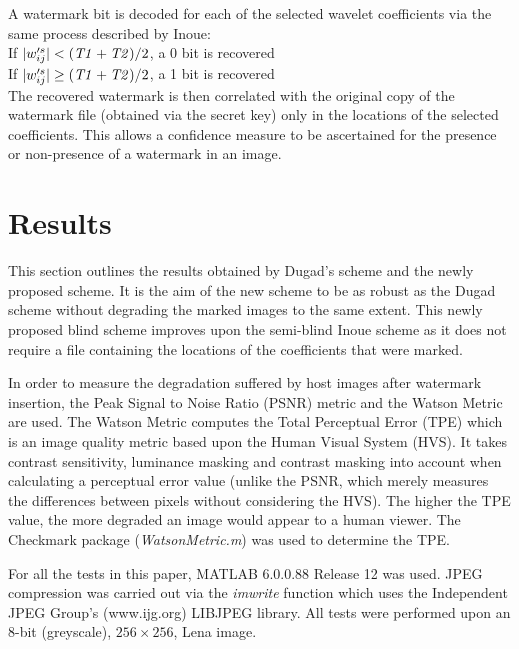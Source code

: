 \documentclass[10pt,twocolumn]{article}
\begin{document}
A watermark
bit is decoded for each of the selected wavelet coefficients via the same process
described by Inoue: \\
If $|w'^{s}_{ij}| < (\mbox{\emph{T1}} + \mbox{\emph{T2}}) / 2$, a 0 bit is recovered \\
If $|w'^{s}_{ij}| \geq (\mbox{\emph{T1}} + \mbox{\emph{T2}}) / 2$, a 1 bit is recovered \\
The recovered watermark is then correlated with the original copy of the
watermark file (obtained via the secret key) only in the 
locations of the selected coefficients. This allows a confidence measure
to be ascertained for the presence or non-presence of a watermark in an 
image.

\section{Results}
This section outlines the results obtained by Dugad's scheme and the newly 
proposed scheme. It is the aim of the new scheme to be as robust as
the Dugad scheme without degrading the marked images to the same extent. 
This newly proposed blind scheme improves upon the semi-blind Inoue scheme
as it does not require a file containing the locations of the coefficients that were marked.

In order to measure the degradation suffered by host images after watermark insertion, the
Peak Signal to Noise Ratio (PSNR) metric and the Watson Metric \cite{watsonDCT, mayache} are used.
The Watson Metric computes the Total Perceptual Error (TPE)
which is an image quality metric based upon the Human Visual System (HVS).
It takes contrast sensitivity,
luminance masking and contrast masking into account when calculating 
a perceptual error value (unlike the PSNR, which merely measures the differences
between pixels without considering the HVS). The higher the TPE value, the more degraded an
image would appear to a human viewer.
The Checkmark package \cite{ChkMrk:pereira} (\emph{WatsonMetric.m}) was used to determine the TPE.

For all the tests in this paper, MATLAB
6.0.0.88 Release 12 was used. JPEG compression was carried out via the \emph{imwrite}
function which uses the Independent JPEG Group's (www.ijg.org) LIBJPEG library.  
All tests were performed upon an 8-bit (greyscale), $256 \times 256$, Lena image.

\end{document}
